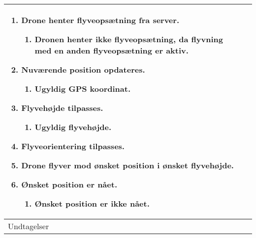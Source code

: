 \begin{table}[H]
\begin{tabular}{| p{3cm}| p{11.5cm}|}
									\begin{enumerate}[topsep=0.0cm, leftmargin=0.5cm]
										\item Drone henter flyveopsætning fra server.
											\begin{enumerate}[partopsep=4cm, topsep=0cm, leftmargin=1cm]
												\item Dronen henter ikke flyveopsætning, da flyvning \newline med en anden flyveopsætning er aktiv.
											\end{enumerate}
										\item Nuværende position opdateres.
											\begin{enumerate}[partopsep=4cm, topsep=0cm, leftmargin=1cm]
												\item Ugyldig GPS koordinat.
											\end{enumerate}
										\item Flyvehøjde tilpasses.
											\begin{enumerate}[partopsep=4cm, topsep=0cm, leftmargin=1cm]
												\item Ugyldig flyvehøjde.
											\end{enumerate}
										\item Flyveorientering tilpasses.
										\item Drone flyver mod ønsket position i ønsket flyvehøjde.
										\item Ønsket position er nået.
										\begin{enumerate}[partopsep=4cm, topsep=0cm, leftmargin=1cm]
												\item Ønsket position er ikke nået.
											\end{enumerate}
									\end{enumerate} \\\hline	

Undtagelser							& 


\end{tabular}
\end{table}
